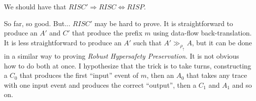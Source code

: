 \documentclass{article}
\begin{document}
We should have that \(RISC' \Rightarrow RISC \Leftrightarrow RISP\).

So far, so good. But... \(RISC'\) may be hard to prove. It is straightforward to produce
an \(A'\) and \(C'\) that produce the prefix \(m\) using data-flow back-translation.
It is less straightforward to produce an \(A'\) such that \(A' \gg_{\rho_\uparrow} A\),
but it can be done in a similar way to proving {\em Robust Hypersafety Preservation}.
It is not obvious how to do both at once. I hypothesize that the trick is to take turns,
constructing a \(C_0\) that produces the first ``input'' event of \(m\), then an \(A_0\) that
takes any trace with one input event and produces the correct ``output'', then a \(C_1\) and
\(A_1\) and so on.
\end{document}
